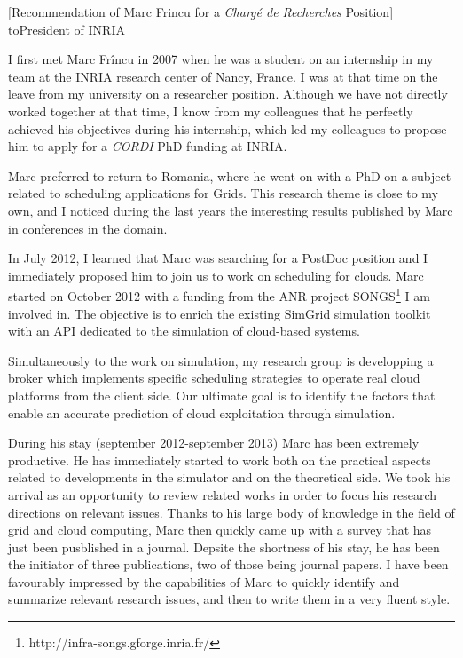 \documentclass[a4paper,10pt]{article}
\begin{document}

\begin{letter}[Recommendation of Marc Frincu for a \emph{Chargé de Recherches} Position]%
{to}{President of INRIA}
 

I first met Marc  Fr\^incu in 2007 when he was a student  on an internship in my
team at the  INRIA research center of Nancy,  France. I was at that  time on the
leave from my university on a researcher position. Although we have not directly
worked  together at  that time,  I  know from  my colleagues  that he  perfectly
achieved  his objectives  during  his  internship, which  led  my colleagues  to
propose him to apply for a \emph{CORDI} PhD funding at INRIA.

Marc preferred to  return to Romania, where he  went on with a PhD  on a subject
related to scheduling applications for Grids. This research theme is close to my
own, and I  noticed during the last years the  interesting results published by
Marc in conferences in the domain.

In July  2012, I learned that  Marc was searching  for a PostDoc position  and I
immediately  proposed him  to join  us to  work on  scheduling for  clouds. Marc
started   on   October   2012   with    a   funding   from   the   ANR   project
SONGS\footnote{http://infra-songs.gforge.inria.fr/}  I  am   involved  in.   The
objective  is to  enrich the  existing SimGrid  simulation toolkit  with an  API
dedicated to the simulation of cloud-based systems.

Simultaneously to  the work on  simulation, my  research group is  developping a
broker which  implements specific  scheduling strategies  to operate  real cloud
platforms from  the client side.  Our ultimate goal  is to identify  the factors
that enable an accurate prediction of cloud exploitation through simulation.

During  his  stay  (september  2012-september  2013)  Marc  has  been  extremely
productive. He  has immediately started  to work  both on the  practical aspects
related to  developments in the simulator  and on the theoretical  side. We took
his arrival  as an  opportunity to review  related works in  order to  focus his
research directions on relevant issues. Thanks to his large body of knowledge in
the field of grid  and cloud computing, Marc then quickly came  up with a survey
that has just been  pusblished in a journal. Depsite the  shortness of his stay,
he has  been the  initiator of  three publications, two  of those  being journal
papers. I have been favourably impressed  by the capabilities of Marc to quickly
identify and  summarize relevant research  issues, and then  to write them  in a
very fluent style.


\end{letter}
\end{document}
